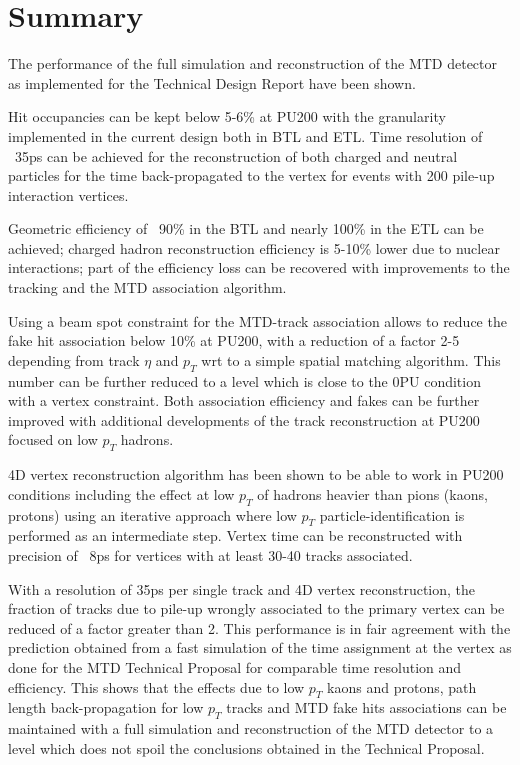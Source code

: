 \section{Summary}
The performance of the full simulation and reconstruction of the MTD detector as implemented for the Technical Design Report have been shown. 

Hit occupancies can be kept below 5-6\% at PU200 with the granularity implemented in the current design both in BTL and ETL. Time resolution of ~35ps can be achieved for the reconstruction of both charged and neutral particles for the time back-propagated to the vertex for events with 200 pile-up interaction vertices. 

Geometric efficiency of ~90\% in the BTL and nearly 100\% in the ETL can be achieved; charged hadron reconstruction efficiency is 5-10\% lower due to nuclear interactions; part of the efficiency loss can be recovered with improvements to the tracking and the MTD association algorithm. 

Using a beam spot constraint for the MTD-track association allows to reduce the fake hit association below 10\% at PU200, with a reduction of a factor 2-5 depending from track $\eta$ and $p_{T}$ wrt to a simple spatial matching algorithm. This number can be further reduced to a level which is close to the 0PU condition with a vertex constraint. Both association efficiency and fakes can be further improved with additional developments of the track reconstruction at PU200 focused on low $p_{T}$ hadrons. 

4D vertex reconstruction algorithm has been shown to be able to work in PU200 conditions including the effect at low $p_{T}$ of hadrons heavier than pions (kaons, protons) using an iterative approach where low $p_{T}$ particle-identification is performed as an intermediate step. Vertex time can be reconstructed with precision of ~8ps for vertices with at least 30-40 tracks associated. 

With a resolution of 35ps per single track and 4D vertex reconstruction, the fraction of tracks due to pile-up wrongly associated to the primary vertex can be reduced of a factor greater than 2. This performance is in fair agreement with the prediction obtained from a fast simulation of the time assignment at the vertex as done for the MTD Technical Proposal for comparable time resolution and efficiency. This shows that the effects due to low $p_{T}$ kaons and protons, path length back-propagation for low $p_{T}$ tracks and MTD fake hits associations can be maintained with a full simulation and reconstruction of the MTD detector to a level which does not spoil the conclusions obtained in the Technical Proposal. 